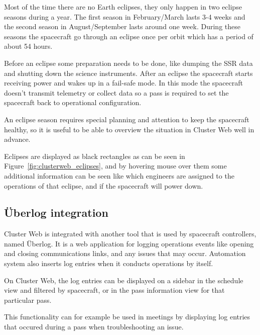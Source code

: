 Most of the time there are no Earth eclipses, they only happen in two eclipse seasons during a year. The first season in February/March lasts 3-4 weeks and the second season in August/September lasts around one week. During these seasons the spacecraft go through an eclipse once per orbit which has a period of about 54 hours.

Before an eclipse some preparation needs to be done, like dumping the SSR data and shutting down the science instruments. After an eclipse the spacecraft starts receiving power and wakes up in a fail-safe mode. In this mode the spacecraft doesn't transmit telemetry or collect data so a pass is required to set the spacecraft back to operational configuration.

 An eclipse season requires special planning and attention to keep the spacecraft healthy, so it is useful to be able to overview the situation in Cluster Web well in advance.
 
 Eclipses are displayed as black rectangles as can be seen in Figure~\ref{fig:clusterweb_eclipses}, and by hovering mouse over them some additional information can be seen like which engineers are assigned to the operations of that eclipse, and if the spacecraft will power down.
 
 \subsection{Überlog integration}
 Cluster Web is integrated with another tool that is used by spacecraft controllers, named Überlog. It is a web application for logging operations events like opening and closing communications links, and any issues that may occur. Automation system also inserts log entries when it conducts operations by itself.
 
 On Cluster Web, the log entries can be displayed on a sidebar in the schedule view and filtered by spacecraft, or in the pass information view for that particular pass.
 
 This functionality can for example be used in meetings by displaying log entries that occured during a pass when troubleshooting an issue.
 
